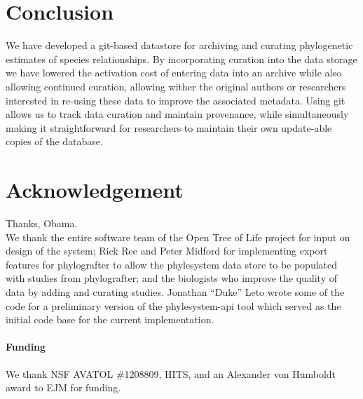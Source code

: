 \documentclass{bioinfo}
\newcommand{\ps}{phylesystem\xspace}
\newcommand{\otol}{Open Tree of Life\xspace}
\begin{document}
\section{Conclusion}
We have developed a git-based datastore for archiving and curating phylogenetic estimates of species relationships.
By incorporating curation into the data storage we have lowered the activation cost of entering data into
    an archive while also allowing continued curation, allowing wither the original authors or researchers
    interested in re-using these data to improve the associated metadata.
Using git allows us to track data curation and maintain provenance, while simultaneously making it straightforward
    for researchers to maintain their own update-able copies of the database.

\section*{Acknowledgement} Thanks, Obama.\\
We thank the entire software team of the \otol project for input on design of the system;
Rick Ree and Peter Midford for implementing export features for phylografter to allow the \ps
    data store to be populated with studies from phylografter; and 
the biologists who improve the quality of data by adding and curating studies.
Jonathan ``Duke'' Leto wrote some of the code for a preliminary version of the \ps-api tool
    which served as the initial code base for the current implementation.
\paragraph{Funding\textcolon} We thank NSF AVATOL \#1208809, HITS, and an Alexander von Humboldt award to EJM for funding.


\end{document}
